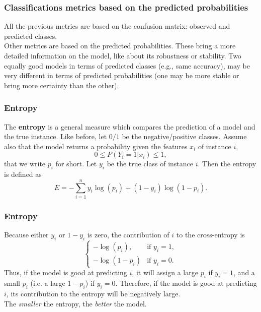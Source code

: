 \begin{frame}
\frametitle{Classifications metrics based on the predicted probabilities}
All the previous metrics are based on the confusion matrix: observed and predicted classes.\\
\vspace{0.3cm}
Other metrics are based on the predicted probabilities. These bring a more detailed information on the model, like about its robustness or stability. Two equally good models in terms of predicted classes (e.g., same accuracy), may be very different in terms of predicted probabilities (one may be more stable or bring more certainty than the other).
\end{frame}
\begin{frame}
\frametitle{Entropy}
The {\bf entropy} is a general measure which compares the prediction of a model and the true instance. Like before, let $0/1$ be the negative/positive classes. Assume also that the model returns a probability given the features $x_i$ of instance $i$,
$$
0 \leq P(Y_i=1|x_i) \leq 1,
$$
that we write $p_i$ for short. Let $y_i$ be the true class of instance $i$. Then the entropy is defined as
$$
E = -\sum_{i=1}^n y_i \log(p_i) + (1-y_i)\log(1-p_i).
$$
\end{frame}
\begin{frame}
\frametitle{Entropy}
Because either $y_i$ or $1-y_i$ is zero, the contribution of $i$ to the cross-entropy is
$$
\left\{
\begin{array}{ll}
-\log(p_i), & \mbox{if } y_i=1,\\
-\log(1-p_i) & \mbox{if } y_i=0.
\end{array}
\right.
$$
Thus, if the model is good at predicting $i$, it will assign a large $p_i$ if $y_i=1$, and a small $p_i$ (i.e. a large $1-p_i$) if $y_i=0$. Therefore, if the model is good at predicting $i$, its contribution to the entropy will be negatively large.\\
\vspace{0.2cm}
The {\it smaller} the entropy, the {\it better} the model.
\end{frame}

